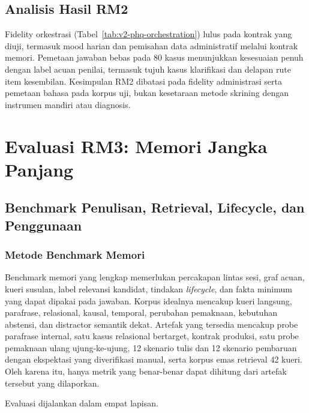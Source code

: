 \subsection{Analisis Hasil RM2}

Fidelity orkestrasi (Tabel~\ref{tab:v2-phq-orchestration}) lulus pada kontrak yang diuji, termasuk mood harian dan pemisahan data administratif melalui kontrak memori. Pemetaan jawaban bebas pada 80 kasus menunjukkan kesesuaian penuh dengan label acuan penilai, termasuk tujuh kasus klarifikasi dan delapan rute item kesembilan. Kesimpulan RM2 dibatasi pada fidelity administrasi serta pemetaan bahasa pada korpus uji, bukan kesetaraan metode skrining dengan instrumen mandiri atau diagnosis.

\section{Evaluasi RM3: Memori Jangka Panjang}
\label{sec:v2-memory}

\subsection{Benchmark Penulisan, Retrieval, Lifecycle, dan Penggunaan}

\subsubsection{Metode Benchmark Memori}

Benchmark memori yang lengkap memerlukan percakapan lintas sesi, graf acuan, kueri susulan, label relevansi kandidat, tindakan \textit{lifecycle}, dan fakta minimum yang dapat dipakai pada jawaban. Korpus idealnya mencakup kueri langsung, parafrase, relasional, kausal, temporal, perubahan pemaknaan, kebutuhan abstensi, dan distractor semantik dekat. Artefak yang tersedia mencakup probe parafrase internal, satu kasus relasional bertarget, kontrak produksi, satu probe pemaknaan ulang ujung-ke-ujung, 12 skenario tulis dan 12 skenario pembaruan dengan ekspektasi yang diverifikasi manual, serta korpus emas retrieval 42 kueri. Oleh karena itu, hanya metrik yang benar-benar dapat dihitung dari artefak tersebut yang dilaporkan.

Evaluasi dijalankan dalam empat lapisan.


